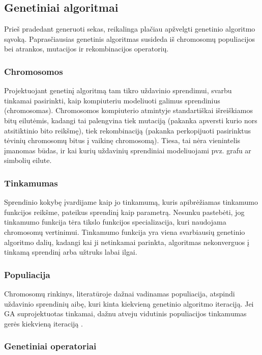\documentclass{VUMIFInfKursinis}
\begin{document}
\subsection{Genetiniai algoritmai}

Prieš pradedant generuoti sekas, reikalinga plačiau apžvelgti genetinio algoritmo sąvoką.
Paprasčiausias genetinis algoritmas susideda iš chromosomų populiacijos bei atrankos, mutacijos ir rekombinacijos operatorių.

\subsubsection{Chromosomos}

Projektuojant genetinį algoritmą tam tikro uždavinio sprendimui, svarbu tinkamai pasirinkti,
kaip kompiuteriu modeliuoti galimus sprendinius (chromosomas).
Chromosomos kompiuterio atmintyje standartiškai išreiškiamos bitų eilutėmis,
kadangi tai palengvina tiek mutaciją (pakanka apversti kurio nors atsitiktinio bito reikšmę),
tiek rekombinaciją (pakanka perkopijuoti pasirinktus tėvinių chromosomų bitus į vaikinę chromosomą).
Tiesa, tai nėra vienintelis įmanomas būdas, ir kai kurių uždavinių sprendiniai modeliuojami pvz. grafu ar simbolių eilute.

\subsubsection{Tinkamumas}

Sprendinio kokybę įvardijame kaip jo tinkamumą, kuris apibrėžiamas tinkamumo funkcijos reikšme, pateikus sprendinį kaip parametrą.
Nesunku pastebėti, jog tinkamumo funkcija tėra tikslo funkcijos specializacija, kuri naudojama chromosomų vertinimui.
Tinkamumo funkcija yra viena svarbiausių genetinio algoritmo dalių,
kadangi kai ji netinkamai parinkta, algoritmas nekonverguos į tinkamą sprendinį arba užtruks labai ilgai.

\subsubsection{Populiacija}

Chromosomų rinkinys, literatūroje dažnai vadinamas populiacija, atspindi uždavinio sprendinių aibę, kuri kinta kiekvieną genetinio algoritmo iteraciją.
Jei GA suprojektuotas tinkamai, dažnu atveju vidutinis populiacijos tinkamumas gerės kiekvieną iteraciją \cite{simpson1999faster}.

\subsubsection{Genetiniai operatoriai}
\end{document}
